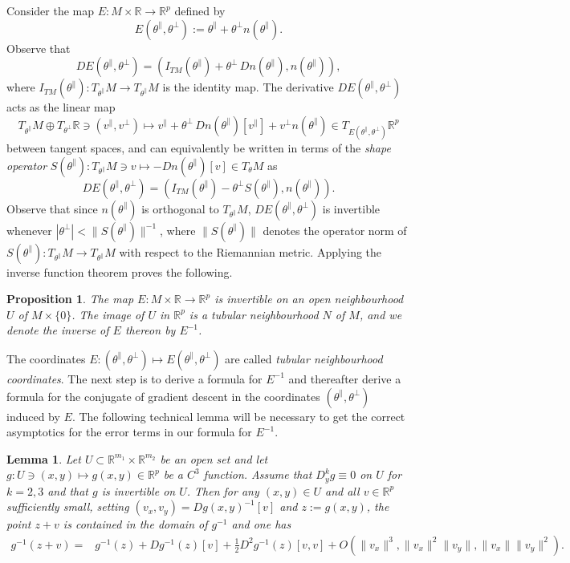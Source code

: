 \documentclass{article}
\newcommand{\RB}{\mathbb{R}}
\newcommand{\tpa}{\theta^{\parallel}}
\newcommand{\tpe}{\theta^{\perp}}
\theoremstyle{plain}
\newtheorem{proposition}[theorem]{Proposition}
\newtheorem{lemma}[theorem]{Lemma}
\theoremstyle{definition}
\theoremstyle{remark}
\begin{document}
Consider the map $E:M\times\RB\rightarrow\RB^p$ defined by
\begin{equation}
    E(\tpa,\tpe):=\tpa+\tpe n(\tpa).
\end{equation}
Observe that
\begin{equation}
    DE(\tpa,\tpe) = (I_{TM}(\tpa)+\tpe\, Dn(\tpa),n(\tpa)),
\end{equation}
where $I_{TM}(\tpa):T_{\tpa}M\rightarrow T_{\tpa}M$ is the identity map. The derivative $DE(\tpa,\tpe)$ acts as the linear map
\begin{equation}
    T_{\tpa}M\oplus T_{\tpe}\RB\ni (v^{\parallel},v^{\perp})\mapsto v^{\parallel}+\tpe\,Dn(\tpa)[v^{\parallel}]+v^{\perp}n(\tpa)\in T_{E(\tpa,\tpe)}\RB^p
\end{equation}
between tangent spaces, and can equivalently be written in terms of the \emph{shape operator} $S(\tpa):T_{\tpa}M\ni v\mapsto -Dn(\tpa)[v]\in T_{\theta}M$ as
\begin{equation}
    DE(\tpa,\tpe) = (I_{TM}(\tpa)-\tpe S(\tpa),n(\tpa)).
\end{equation}
Observe that since $n(\tpa)$ is orthogonal to $T_{\tpa}M$, $DE(\tpa,\tpe)$ is invertible whenever $|\tpe|<\|S(\tpa)\|^{-1}$, where $\|S(\tpa)\|$ denotes the operator norm of $S(\tpa):T_{\tpa}M\rightarrow T_{\tpa}M$ with respect to the Riemannian metric. Applying the inverse function theorem proves the following.

\begin{proposition}\label{prop:tube}
    The map $E:M\times\RB\rightarrow\RB^p$ is invertible on an open neighbourhood $U$ of $M\times\{0\}$.
    The image of $U$ in $\RB^p$ is a tubular neighbourhood $N$ of $M$, and we denote the inverse of $E$ thereon by $E^{-1}$.
\end{proposition}

The coordinates $E:(\tpa,\tpe)\mapsto E(\tpa,\tpe)$ are called \emph{tubular neighbourhood coordinates}. The next step is to derive a formula for $E^{-1}$ and thereafter derive a formula for the conjugate of gradient descent in the coordinates $(\tpa,\tpe)$ induced by $E$. The following technical lemma will be necessary to get the correct asymptotics for the error terms in our formula for $E^{-1}$.

\begin{lemma}\label{lem:higherorderterms}
    Let $U\subset\RB^{m_1}\times\RB^{m_2}$ be an open set and let $g:U\ni(x,y)\mapsto g(x,y)\in\RB^p$ be a $C^3$ function. Assume that $D^k_yg \equiv0$ on $U$ for $k=2,3$ and that $g$ is invertible on $U$. Then for any $(x,y)\in U$ and all $v\in \RB^p$ sufficiently small, setting $(v_x,v_y) = Dg(x,y)^{-1}[v]$ and $z:=g(x,y)$, the point $z+v$ is contained in the domain of $g^{-1}$ and one has
    \begin{align}
        g^{-1}(z+v) =& g^{-1}(z) + Dg^{-1}(z)[v] + \frac{1}{2}D^2g^{-1}(z)[v,v] + O(\|v_x\|^3,\|v_x\|^2\|v_y\|,\|v_x\|\|v_y\|^2).
    \end{align}
\end{lemma}
\end{document}
